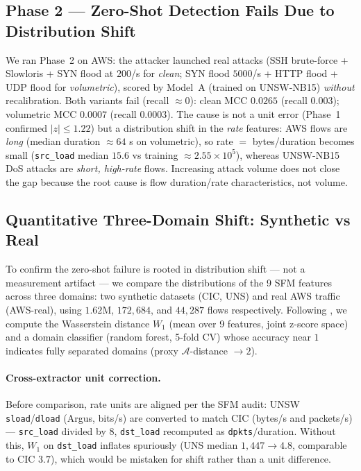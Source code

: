 \documentclass[preprint,12pt,authoryear]{elsarticle}
\begin{document}
\subsection{Phase 2 --- Zero-Shot Detection Fails Due to Distribution Shift}
\label{sec:rt-phase2}
We ran Phase~2 on AWS: the attacker launched real attacks (SSH brute-force +
Slowloris + SYN flood at $200$/s for \emph{clean}; SYN flood $5000$/s + HTTP flood
+ UDP flood for \emph{volumetric}), scored by Model~A (trained on UNSW-NB15)
\emph{without} recalibration. Both variants fail (recall $\approx 0$): clean MCC
$0.0265$ (recall $0.003$); volumetric MCC $0.0007$ (recall $0.0003$). The cause is
not a unit error (Phase~1 confirmed $|z|\le 1.22$) but a distribution shift in the
\emph{rate} features: AWS flows are \emph{long} (median duration $\approx 64$ s on
volumetric), so rate $=$ bytes/duration becomes small (\texttt{src\_load} median
$15.6$ vs training $\approx 2.55\times10^{5}$), whereas UNSW-NB15 DoS attacks are
\emph{short, high-rate} flows. Increasing attack volume does not close the gap
because the root cause is flow duration/rate characteristics, not volume.

\subsection{Quantitative Three-Domain Shift: Synthetic vs Real}
\label{sec:rt-shift}
To confirm the zero-shot failure is rooted in distribution shift --- not a
measurement artifact --- we compare the distributions of the 9 SFM features across
three domains: two synthetic datasets (CIC, UNS) and real AWS traffic (AWS-real),
using $1.62$M, $172{,}684$, and $44{,}287$ flows respectively. Following
\citet{layeghy}, we compute the Wasserstein distance $W_1$ (mean over 9 features,
joint z-score space) and a domain classifier (random forest, 5-fold CV) whose
accuracy near $1$ indicates fully separated domains (proxy
$\mathcal{A}$-distance $\to 2$).

\paragraph{Cross-extractor unit correction.} Before comparison, rate units are
aligned per the SFM audit: UNSW \texttt{sload}/\texttt{dload} (Argus, bits/s) are
converted to match CIC (bytes/s and packets/s) --- \texttt{src\_load} divided by
$8$, \texttt{dst\_load} recomputed as \texttt{dpkts}$/$duration. Without this, $W_1$
on \texttt{dst\_load} inflates spuriously (UNS median $1{,}447\to4.8$, comparable to
CIC $3.7$), which would be mistaken for shift rather than a unit difference.
\end{document}
